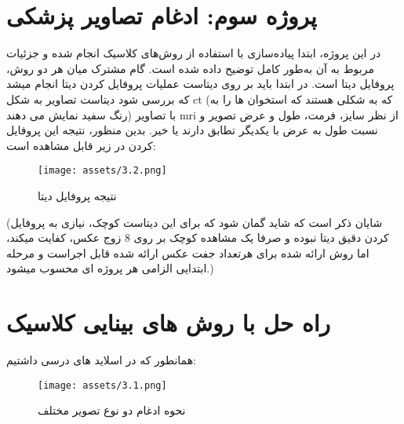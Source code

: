 \documentclass[a4paper,12pt]{article}
\begin{document}
\pagebreak


\section{پروژه سوم: ادغام تصاویر پزشکی}
در این پروژه، ابتدا پیاده‌سازی با استفاده از روش‌های کلاسیک انجام شده و جزئیات مربوط به آن به‌طور کامل توضیح داده شده است. گام مشترک میان هر دو روش، پروفایل دیتا است.
در ابتدا باید بر روی دیتاست عملیات پروفایل کردن دیتا انجام میشد که بررسی شود دیتاست تصاویر به شکل ct (که به شکلی هستند که استخوان ها را به رنگ سفید نمایش می دهند) با تصاویر mri از نظر سایز، فرمت، طول و عرض تصویر و نسبت طول به عرض با یکدیگر تطابق دارند یا خیر. بدین منظور، نتیجه این پروفایل کردن در زیر قابل مشاهده است:

\begin{figure}[h]
	\centering
	\texttt{[image: assets/3.2.png]}
	\caption{\textcolor{CustomAccent}{نتیجه پروفایل دیتا}}
\end{figure}
(شایان ذکر است که شاید گمان شود که برای این دیتاست کوچک، نیازی به پروفایل کردن دقیق دیتا نبوده و صرفا یک مشاهده کوچک بر روی 8 زوج عکس، کفایت میکند، اما روش ارائه شده برای هرتعداد جفت عکس ارائه شده قابل اجراست و مرحله ابتدایی الزامی هر پروژه ای محسوب میشود.)

\section*{راه حل با روش های بینایی کلاسیک}

همانطور که در اسلاید های درسی داشتیم:
\begin{figure}[h]
	\centering
	\texttt{[image: assets/3.1.png]}
	\caption{\textcolor{CustomAccent}{نحوه ادغام دو نوع تصویر مختلف}}
\end{figure}
\end{document}
